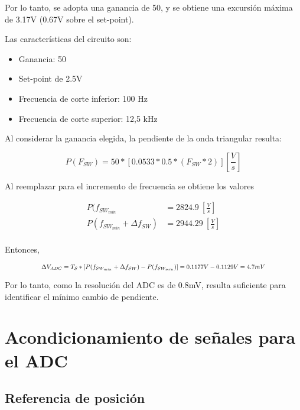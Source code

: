 \noindent Por lo tanto, se adopta una ganancia de 50, y se obtiene una excursión máxima de 3.17V (0.67V sobre el set-point).

\noindent Las características del circuito son:

\begin{itemize}
	\item Ganancia: 50
	\item Set-point de 2.5V 
	\item Frecuencia de corte inferior: 100 Hz
	\item Frecuencia de corte superior: 12,5 kHz
\end{itemize}

\noindent Al considerar la ganancia elegida,  la pendiente de la onda triangular resulta:

\begin{equation} 
	P(F_{SW}) = 50 * [0.0533 * 0.5 * (F_{SW}*2)][\frac{V}{s}]
\end{equation}

\noindent Al reemplazar para el incremento de frecuencia se obtiene los valores 

\begin{equation} 
	\begin{aligned}
		P(f_{SW_{min}} &= 2824.9 \ [\frac{V}{s}]\\
		P(f_{SW_{min}} + \Delta f_{SW}) &= 2944.29 \ [\frac{V}{s}]\\		 
	\end{aligned}
\end{equation}

\noindent Entonces, 


\begin{equation} 
	\resizebox{.8\hsize}{!}
	{
	$\Delta V_{ADC} = T_S * [P(f_{SW_{min}} + \Delta f_{SW}) - P(f_{SW_{min}})] = 0.1177 V - 0.1129 V = 4.7mV$
	}
\end{equation}


\noindent Por lo tanto, como la resolución del ADC es de 0.8mV, resulta suficiente para identificar el mínimo cambio de pendiente.


\section{Acondicionamiento de señales para el ADC}

\subsection{Referencia de posición}

